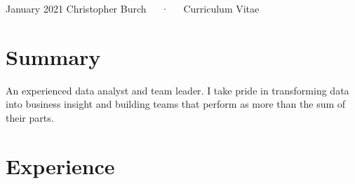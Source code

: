 \documentclass[11pt, a4paper]{awesome-cv}
\begin{document}
\makecvheader

\makecvfooter
  {January 2021}
    {Christopher Burch~~~·~~~Curriculum Vitae}
  {\thepage}





\hypertarget{summary}{%
\section{Summary}\label{summary}}

An experienced data analyst and team leader. I take pride in
transforming data into business insight and building teams that perform
as more than the sum of their parts.

\hypertarget{experience}{%
\section{Experience}\label{experience}}
\end{document}
